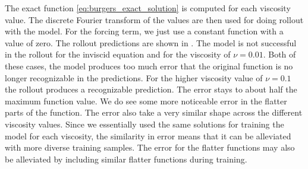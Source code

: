The exact function \cref{eq:burgers_exact_solution} is computed for each viscosity value. The discrete Fourier transform of the values are then used for doing rollout with the model. For the forcing term, we just use a constant function with a value of zero. The rollout predictions are shown in . The model is not successful in the rollout for the inviscid equation and for the viscosity of \(\nu=0.01\). Both of these cases, the model produces too much error that the original function is no longer recognizable in the predictions. For the higher viscosity value of \(\nu=0.1\) the rollout produces a recognizable prediction. The error stays to about half the maximum function value. We do see some more noticeable error in the flatter parts of the function. The error also take a very similar shape across the different viscosity values. Since we essentially used the same solutions for training the model for each viscosity, the similarity in error means that it can be alleviated with more diverse training samples. The error for the flatter functions may also be alleviated by including similar flatter functions during training.
